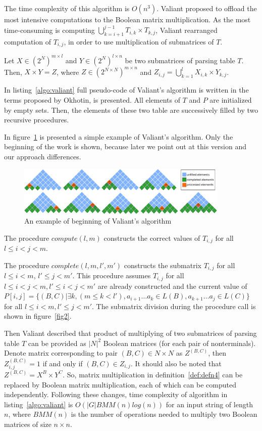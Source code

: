 The time complexity of this algorithm is $O(n^3)$. Valiant proposed to offload the most intensive computations to the Boolean matrix multiplication. As the most time-consuming is computing $\bigcup\limits_{k = i + 1}^{j - 1} T_{i, k} \times T_{k, j}$, Valiant rearranged computation of $T_{i, j}$, in order to use multiplication of submatrices of $T$.

\label{def:defn4} Let $X \in (2^N)^{m \times l}$ and $Y \in (2^N)^{l \times n}$ be two submatrices of parsing table $T$. Then, $X \times Y = Z$, where $Z \in (2^{N \times N})^{m \times n}$ and $Z_{i, j} = \bigcup\limits_{k = 1}^{l} X_{i, k} \times Y_{k, j}$.

In listing~\ref{algo:valiant} full pseudo-code of Valiant's algorithm is written in the terms proposed by Okhotin, is presented. All elements of $T$ and $P$ are initialized by empty sets. Then, the elements of these two table are successively filled by two recursive procedures. 

In figure~\ref{fig1} is presented a simple example of Valiant's algorithm. Only the beginning of the work is shown, because later we point out at this version and our approach differences. 

\begin{figure}
    \centering
    \includegraphics[width=0.900\textwidth]{pictures/valbeg2.pdf}
    \caption{An example of beginning of Valiant's algorithm}
    \label{fig1}
\end{figure}

The procedure $compute(l, m)$ constructs the correct values of $T_{i,j}$ for all $l \le i < j < m$.

The procedure $complete(l, m, l', m')$ constructs the submatrix $T_{i, j}$ for all $l \le i < m$, $l' \le j < m'$. This procedure assumes $T_{i, j}$ for all $l \leq i < j < m,  l' \leq i < j < m'$ are already constructed and the current value of  $P[i, j] =  \{ (B, C) |\exists k, (m \le k < l'), a_{i + 1} \dots a_{k} \in L(B), a_{k + 1} \dots a_{j} \in L(C)\}$ for all $l \leq i < m,  l' \leq j < m'$. The submatrix division during the procedure call is shown in figure~\ref{fig2}.

Then Valiant described that product of multiplying of two submatrices of parsing table $T$ can be provided as $|N|^2$ Boolean matrices (for each pair of nonterminals). Denote matrix corresponding to pair $(B, C) \in N \times N$ as $Z^{(B, C)}$, then $Z_{i, j}^{(B, C)} = 1$ if and only if $(B, C) \in Z_{i, j}$. It should also be noted that $Z^{(B, C)} = X^{B} \times Y^{C}$. So, matrix multiplication in definition~\ref{def:defn4} can be replaced by Boolean matrix multiplication, each of which can be computed independently. Following these changes, time complexity of algorithm in listing~\ref{algo:valiant} is $O(|G|BMM(n)log(n))$ for an input string of length $n$, where $BMM(n)$ is the number of operations needed to multiply two Boolean matrices of size $n \times n$.

